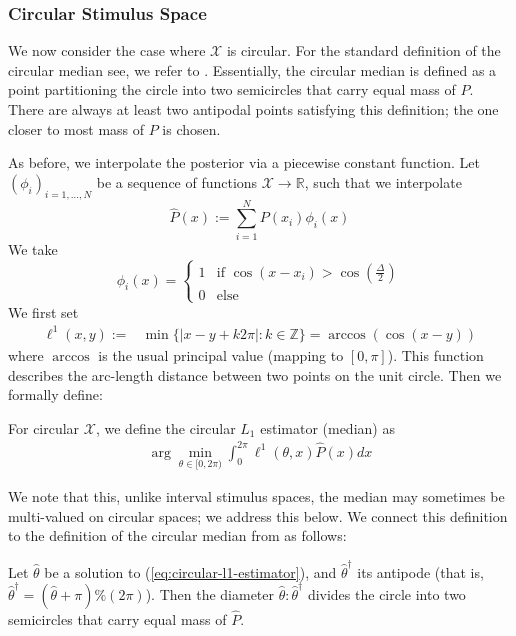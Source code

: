 \subsubsection*{Circular Stimulus Space}



We now consider the case where $\mathcal{X}$ is circular.
For the standard definition of the circular median see, we refer to \citet{otieno2003more}. 
Essentially, the circular median is defined as a point partitioning the circle into two semicircles that carry equal mass of $P$. There are always at least two antipodal points satisfying this definition; the one closer to most mass of $P$ is chosen.


As before, we interpolate the posterior via a piecewise constant function.
Let $(\phi_i)_{i=1, \dots, N}$ be a sequence of functions $\mathcal{X} \rightarrow \mathbb{R}$, such that we interpolate
\begin{equation}
    \widehat{P}(x) := \sum_{i=1}^N P(x_i) \phi_i(x)
\end{equation}
We take
\begin{equation}
    \phi_i(x) = \begin{cases}
        1 & \text{if } \cos(x-x_i) > \cos(\frac{\Delta}{2}) \\
        0 & \text{else}
    \end{cases}
\end{equation}
We first set
\begin{align*}
    \ell^1(x,y) := & \min \{|x-y+k2\pi| : k \in \mathbb{Z}\} = \arccos(\cos(x-y))
\end{align*}
where $\arccos$ is the usual principal value (mapping to $[0,\pi]$). 
This function describes the arc-length distance between two points on the unit circle.
Then we formally define:
\begin{defin}
For circular $\mathcal{X}$, we define the circular $L_1$ estimator (median) as
\begin{align}\label{eq:circular-l1-estimator}
     \arg\min_{\theta \in [0,2\pi)} \int_0^{2\pi} \ell^1(\theta,x) \widehat{P}(x) dx 
\end{align}
\end{defin}
We note that this, unlike interval stimulus spaces, the median may sometimes be multi-valued on circular spaces; we address this below.
We connect this definition to the definition of the circular median from \citet{otieno2003more} as follows: 
\begin{lemma}
Let $\widehat{\theta}$ be a solution to (\ref{eq:circular-l1-estimator}), and $\widehat{\theta}^\dagger$ its antipode (that is, $\widehat{\theta}^\dagger = (\widehat{\theta} + \pi) \% (2\pi)$).
Then the diameter $\widehat{\theta} : \widehat{\theta}^\dagger$  divides the circle into two semicircles that carry equal mass of $\widehat{P}$.
\end{lemma}
